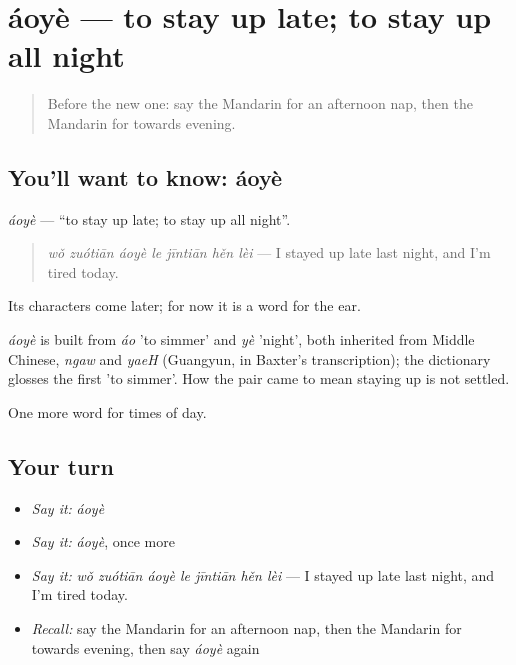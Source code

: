 \section[áoyè]{áoyè — to stay up late; to stay up all night}

\label{lesson:ZH-C169-aoye}



\begin{quote}
Before the new one: say the Mandarin for an afternoon nap, then the Mandarin for towards evening.
\end{quote}

\subsection*{You'll want to know: áoyè}
\emph{áoyè} — \textquotedblleft{}to stay up late; to stay up all night\textquotedblright{}.

\begin{quote}
\emph{wǒ zuótiān áoyè le jīntiān hěn lèi} — I stayed up late last night, and I'm tired today.
\end{quote}

Its characters come later; for now it is a word for the ear.

\begin{cousinweb}
\emph{áoyè} is built from \emph{áo} 'to simmer' and \emph{yè} 'night', both inherited from Middle Chinese, \emph{ngaw} and \emph{yaeH} (Guangyun, in Baxter's transcription); the dictionary glosses the first 'to simmer'. How the pair came to mean staying up is not settled.
\end{cousinweb}

\begin{grammarlens}[title={What you've built}]
One more word for times of day.
\end{grammarlens}

\subsection*{Your turn}
\begin{itemize}
\raggedright
  \item \emph{Say it:} \emph{áoyè}
  \item \emph{Say it:} \emph{áoyè}, once more
  \item \emph{Say it:} \emph{wǒ zuótiān áoyè le jīntiān hěn lèi} — I stayed up late last night, and I'm tired today.
  \item \emph{Recall:} say the Mandarin for an afternoon nap, then the Mandarin for towards evening, then say \emph{áoyè} again
\end{itemize}

